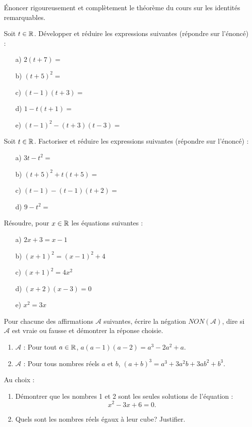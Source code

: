 \documentclass[a4paper,11pt,DIV15,BCOR0mm]{scrartcl}
\begin{document}
\begin{exercice}[Cours]
Énoncer rigoureusement et complètement le théorème du cours
sur les identités remarquables.
\end{exercice}

\begin{exercice}
Soit $t\in\mathbb{R}$. Développer et réduire les expressions suivantes
(répondre sur l'énoncé) :
\begin{enumerate}
  \item[a) ]$2(t+7)=$
  \item[b) ]$(t+5)^2=$
  \item[c) ]$(t-1)(t+3)=$
  \item[d) ]$1-t(t+1)=$
  \item[e) ]$(t-1)^2-(t+3)(t-3)=$
\end{enumerate}
\end{exercice}

\begin{exercice}
Soit $t\in\mathbb{R}$. Factoriser et réduire les expressions suivantes
(répondre sur l'énoncé) :
\begin{enumerate}
  \item[a) ]$3t-t^2=$
  \item[b) ]$(t+5)^2+t(t+5)=$
  \item[c) ]$(t-1)-(t-1)(t+2)=$
  \item[d) ]$9-t^2=$
\end{enumerate}
\end{exercice}



\begin{exercice}
Résoudre, pour $x\in\mathbb{R}$ les équations suivantes :
\begin{enumerate}
  \item[a) ]$2x+3=x-1$
  \item[b) ]$(x+1)^2=(x-1)^2+4$
  \item[c) ]$(x+1)^2=4x^2$
  \item[d) ]$(x+2)(x-3)=0$
  \item[e) ]$x^2=3x$
\end{enumerate}
\end{exercice}

\begin{exercice}
Pour chacune  des affirmations $\mathcal{A}$ suivantes, écrire
la négation $NON(\mathcal{A})$, dire
si $\mathcal{A}$ est vraie ou fausse et démontrer la réponse choisie.
\begin{enumerate}
  \item $\mathcal{A}$ : \og Pour tout $a\in\mathbb{R}$, $a(a-1)(a-2)=a^3-2a^2+a$.\fg
  \item $\mathcal{A}$ : \og Pour tous nombres réels $a$ et $b$, 
  $(a+b)^3=a^3+3a^2b+3ab^2+b^3$. \fg
\end{enumerate}
\end{exercice}

\begin{exercice} Au  choix :
\begin{enumerate}
 \item Démontrer que les nombres 1 et 2 sont les seules solutions de l'équation : \[x^2-3x+6=0.\]
 \item Quels sont les nombres réels égaux à leur cube? Justifier.
\end{enumerate}

 
\end{exercice}
\end{document}
